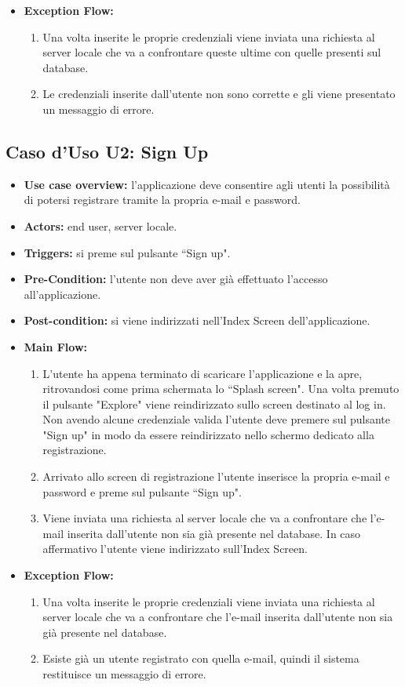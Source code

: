 \begin{itemize}
    \item \textbf{Exception Flow:}\begin{enumerate}
              \item Una volta inserite le proprie credenziali viene inviata una richiesta al server locale che va a confrontare queste ultime con quelle presenti sul database.
              \item Le credenziali inserite dall'utente non sono corrette e gli viene presentato un messaggio di errore. \end{enumerate}
\end{itemize}
\subsection*{Caso d'Uso U2: Sign Up}
\begin{itemize}
    \item  \textbf{Use case overview:} l'applicazione deve consentire agli utenti la possibilit\`a di potersi registrare tramite la propria e-mail e password.
    \item \textbf{Actors:} end user, server locale.
    \item \textbf{Triggers:} si preme sul pulsante ``Sign up".
    \item \textbf{Pre-Condition:} l'utente non deve aver gi\`a effettuato l'accesso all'applicazione.
    \item \textbf{Post-condition:} si viene indirizzati nell'Index Screen dell'applicazione.
    \item \textbf{Main Flow:} \begin{enumerate}
              \item L'utente ha appena terminato di scaricare l'applicazione e la apre, ritrovandosi come prima schermata lo ``Splash screen". Una volta premuto il pulsante "Explore" viene reindirizzato sullo screen destinato al log in. Non avendo alcune credenziale valida l'utente deve premere sul pulsante "Sign up" in modo da essere reindirizzato nello schermo dedicato alla registrazione.
              \item Arrivato allo screen di registrazione l'utente inserisce la propria e-mail e password e preme sul pulsante ``Sign up".
              \item Viene inviata una richiesta al server locale che va a confrontare che l'e-mail inserita dall'utente non sia gi\`a presente nel database. In caso affermativo l'utente viene indirizzato sull'Index Screen.

          \end{enumerate}

    \item \textbf{Exception Flow:}\begin{enumerate}
              \item Una volta inserite le proprie credenziali viene inviata una richiesta al server locale che va a confrontare che l'e-mail inserita dall'utente non sia gi\`a presente nel database.
              \item Esiste gi\`a un utente registrato con quella e-mail, quindi il sistema restituisce un messaggio di errore. \end{enumerate}
\end{itemize}
